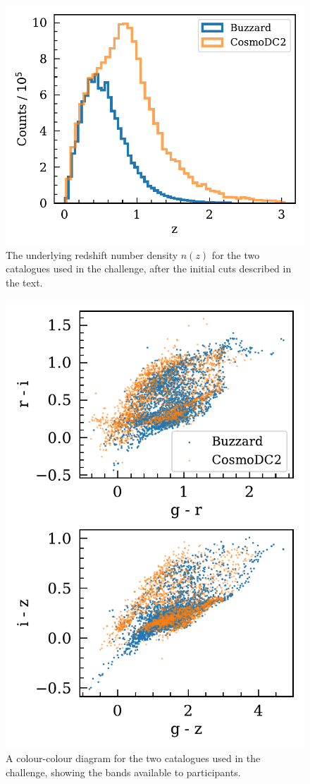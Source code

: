 \documentclass[twocolumn,twocolappendix]{aastex63}
\begin{document}
\begin{figure}[htbp]
	\includegraphics[width=0.9\linewidth]{results/initial_data.pdf}
	\caption{The underlying redshift number density $n(z)$ for the two catalogues used in the challenge,
		after the initial cuts described in the text.}
	\label{fig:initial_nz}
\end{figure}

\begin{figure}[htbp]
	\includegraphics[width=0.9\linewidth]{results/colour_colour.pdf}
	\caption{A colour-colour diagram for the two catalogues used in the challenge, showing the bands
		available to participants.}
	\label{fig:colour_colour}
\end{figure}
\end{document}
